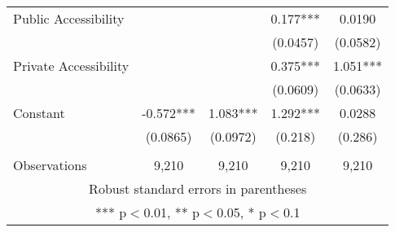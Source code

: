 \documentclass[]{article}
\begin{document}
\begin{tabular}{lcccc}
Public Accessibility &  &  & 0.177*** & 0.0190 \\
 &  &  & (0.0457) & (0.0582) \\
Private Accessibility &  &  & 0.375*** & 1.051*** \\
 &  &  & (0.0609) & (0.0633) \\
Constant & -0.572*** & 1.083*** & 1.292*** & 0.0288 \\
 & (0.0865) & (0.0972) & (0.218) & (0.286) \\
 &  &  &  &  \\
 Observations & 9,210 & 9,210 & 9,210 & 9,210 \\ \hline
\multicolumn{5}{c}{ Robust standard errors in parentheses} \\
\multicolumn{5}{c}{ *** p$<$0.01, ** p$<$0.05, * p$<$0.1} \\
\end{tabular}
\end{document}
